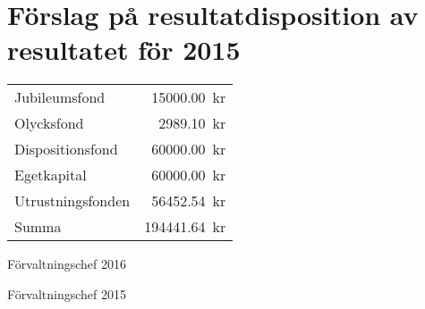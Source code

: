 \documentclass[../_main/handlingar.tex]{subfiles}
\begin{document}
\section{Förslag på resultatdisposition av resultatet för 2015}

\begin{tabular}{l r}

    Jubileumsfond & \SI{15000.00}{kr} \\
    Olycksfond & \SI{2989.10}{kr} \\
    Dispositionsfond & \SI{60000.00}{kr} \\
    Egetkapital & \SI{60000.00}{kr} \\
    Utrustningsfonden & \SI{56452.54}{kr} \\
    \hline
    Summa & \SI{194441.64}{kr} \\
\end{tabular}

\begin{signatures}{2}
    \ist
    \signature{Anders Nilsson}{Förvaltningschef 2016}
    \signature{Henrik Felding}{Förvaltningschef 2015}
\end{signatures}
\end{document}
